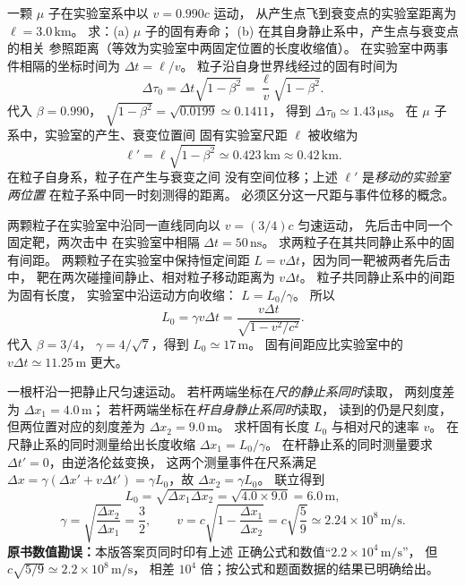 一颗 $\mu$ 子在实验室系中以
$v=0.990c$ 运动，
从产生点飞到衰变点的实验室距离为
$\ell=3.0\,\mathrm{km}$。
求：(a) $\mu$ 子的固有寿命；
(b) 在其自身静止系中，产生点与衰变点的相关
参照距离（等效为实验室中两固定位置的长度收缩值）。
\exsolution
在实验室中两事件相隔的坐标时间为
$\Delta t=\ell/v$。
粒子沿自身世界线经过的固有时间为
\[
\boxed{\Delta\tau_0=
\Delta t\sqrt{1-\beta^2}
=\frac{\ell}{v}\sqrt{1-\beta^2}}.
\]
代入 $\beta=0.990$，
$\sqrt{1-\beta^2}=\sqrt{0.0199}\simeq0.1411$，
得到 $\boxed{\Delta\tau_0\simeq1.43\,\mathrm{\mu s}}$。
在 $\mu$ 子系中，实验室的产生、衰变位置间
固有实验室尺距 $\ell$ 被收缩为
\[
\boxed{\ell'=\ell\sqrt{1-\beta^2}
\simeq0.423\,\mathrm{km}\approx0.42\,\mathrm{km}}.
\]
\excheck 在粒子自身系，粒子在产生与衰变之间
没有空间位移；上述 $\ell'$ 是\emph{移动的实验室两位置}
在粒子系中同一时刻测得的距离。
必须区分这一尺距与事件位移的概念。

两颗粒子在实验室中沿同一直线同向以
$v=(3/4)c$ 匀速运动，
先后击中同一个固定靶，两次击中
在实验室中相隔
$\Delta t=50\,\mathrm{ns}$。
求两粒子在其共同静止系中的固有间距。
\exsolution
两颗粒子在实验室中保持恒定间距
$L=v\Delta t$，因为同一靶被两者先后击中，
靶在两次碰撞间静止、相对粒子移动距离为 $v\Delta t$。
粒子共同静止系中的间距为固有长度，
实验室中沿运动方向收缩：
$L=L_0/\gamma$。
所以
\[
\boxed{L_0=\gamma v\Delta t
=\frac{v\Delta t}{\sqrt{1-v^2/c^2}}}.
\]
代入 $\beta=3/4$，
$\gamma=4/\sqrt7$，得到
$\boxed{L_0\simeq17\,\mathrm m}$。
\excheck 固有间距应比实验室中的
$v\Delta t\simeq11.25\,\mathrm m$ 更大。

一根杆沿一把静止尺匀速运动。
若杆两端坐标在\emph{尺的静止系同时}读取，
两刻度差为 $\Delta x_1=4.0\,\mathrm m$；
若杆两端坐标在\emph{杆自身静止系同时}读取，
读到的仍是尺刻度，但两位置对应的刻度差为
$\Delta x_2=9.0\,\mathrm m$。
求杆固有长度 $L_0$ 与相对尺的速率 $v$。
\exsolution
在尺静止系的同时测量给出长度收缩
$\Delta x_1=L_0/\gamma$。
在杆静止系的同时测量要求
$\Delta t'=0$，由逆洛伦兹变换，
这两个测量事件在尺系满足
$\Delta x=\gamma(\Delta x'+v\Delta t')
=\gamma L_0$，故
$\Delta x_2=\gamma L_0$。
联立得到
\[
\boxed{L_0=\sqrt{\Delta x_1\Delta x_2}
=\sqrt{4.0\times9.0}=6.0\,\mathrm m},
\]
\[
\gamma=\sqrt{\frac{\Delta x_2}{\Delta x_1}}
=\frac32,\qquad
\boxed{v=c\sqrt{1-\frac{\Delta x_1}{\Delta x_2}}
=c\sqrt{\frac59}\simeq2.24\times10^8\,\mathrm{m/s}}.
\]
\excheck \textbf{原书数值勘误：}本版答案页同时印有上述
正确公式和数值“$2.2\times10^4\,\mathrm{m/s}$”，
但 $c\sqrt{5/9}\simeq2.2\times10^8\,\mathrm{m/s}$，
相差 $10^4$ 倍；按公式和题面数据的结果已明确给出。

